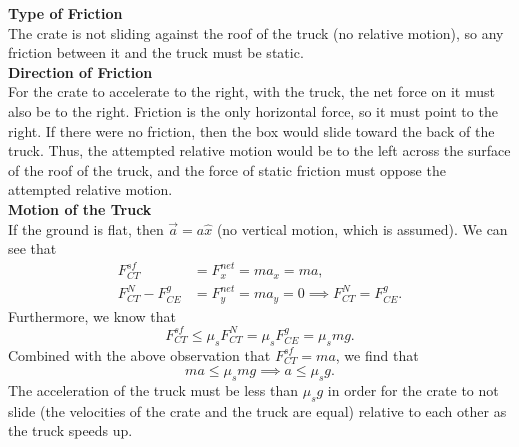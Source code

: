 \documentclass[]{article}
\begin{document}
\begin{TeacherMargin}
\begin{center}
\end{center}
\textbf{Type of Friction} \\
The crate is not sliding against the roof of the truck (no relative motion), so any friction between it and the truck must be static. \\

\noindent\textbf{Direction of Friction} \\
For the crate to accelerate to the right, with the truck, the net force on it must also be to the right. Friction is the only horizontal force, so it must point to the right. If there were no friction, then the box would slide toward the back of the truck. Thus, the attempted relative motion would be to the left across the surface of the roof of the truck, and the force of static friction must oppose the attempted relative motion. \\

\noindent\textbf{Motion of the Truck} \\
If the ground is flat, then $\vec{a}=a\hat{x}$ (no vertical motion, which is assumed). We can see that
\begin{align*}
	F^{sf}_{CT} & = F^{net}_{x} = ma_{x} = ma, \\
	F^{N}_{CT} - F^{g}_{CE} & = F^{net}_{y} = ma_{y} = 0 \implies F^{N}_{CT} = F^{g}_{CE}.
\end{align*}
Furthermore, we know that
\[
F^{sf}_{CT} \leq \mu_{s} F^{N}_{CT} = \mu_{s}F^{g}_{CE} = \mu_{s}mg.
\]
Combined with the above observation that $F^{sf}_{CT} = ma$, we find that
\[
ma \leq \mu_{s}mg \implies a\leq\mu_{s}g.
\]
The acceleration of the truck must be less than $\mu_{s}g$ in order for the crate to not slide (the velocities of the crate and the truck are equal) relative to each other as the truck speeds up.
\end{TeacherMargin}
\end{document}
